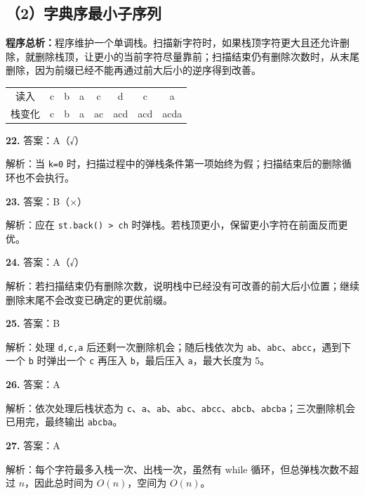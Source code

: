 \documentclass[a4paper]{ctexart}
\newcommand{\ans}[2]{\noindent\textbf{#1} \quad 答案：#2\par}
\newcommand{\expn}[1]{\hspace*{1.5em} 解析：#1\par}
\newcommand{\overview}[1]{\par\smallskip\noindent\textbf{程序总析：}#1\par\smallskip}
\begin{document}
\subsection*{（2）字典序最小子序列}
\overview{程序维护一个单调栈。扫描新字符时，如果栈顶字符更大且还允许删除，就删除栈顶，让更小的当前字符尽量靠前；扫描结束仍有删除次数时，从末尾删除，因为前缀已经不能再通过前大后小的逆序得到改善。}
\begin{center}
\begin{tabular}{c c c c c c c c}
\toprule
读入 & c & b & a & c & d & c & a\\
栈变化 & c & b & a & ac & acd & acd & acda\\
\bottomrule
\end{tabular}
\end{center}
\ans{22.}{A（√）}\expn{当 \texttt{k=0} 时，扫描过程中的弹栈条件第一项始终为假；扫描结束后的删除循环也不会执行。}
\ans{23.}{B（×）}\expn{应在 \texttt{st.back() > ch} 时弹栈。若栈顶更小，保留更小字符在前面反而更优。}
\ans{24.}{A（√）}\expn{若扫描结束仍有删除次数，说明栈中已经没有可改善的前大后小位置；继续删除末尾不会改变已确定的更优前缀。}
\ans{25.}{B}\expn{处理 \texttt{d,c,a} 后还剩一次删除机会；随后栈依次为 \texttt{ab}、\texttt{abc}、\texttt{abcc}，遇到下一个 \texttt{b} 时弹出一个 \texttt{c} 再压入 \texttt{b}，最后压入 \texttt{a}，最大长度为 5。}
\ans{26.}{A}\expn{依次处理后栈状态为 \texttt{c}、\texttt{a}、\texttt{ab}、\texttt{abc}、\texttt{abcc}、\texttt{abcb}、\texttt{abcba}；三次删除机会已用完，最终输出 \texttt{abcba}。}
\ans{27.}{A}\expn{每个字符最多入栈一次、出栈一次，虽然有 while 循环，但总弹栈次数不超过 $n$，因此总时间为 $O(n)$，空间为 $O(n)$。}
\end{document}
